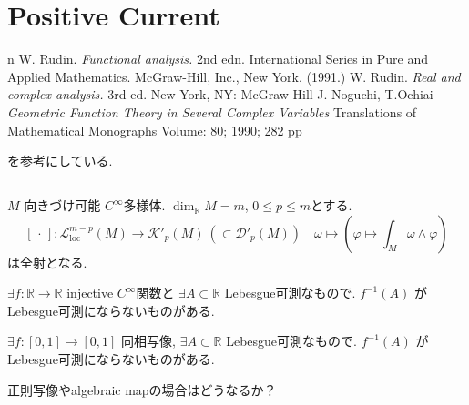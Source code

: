 \chapter{Positive Current}

\begin{thebibliography}{n}
W. Rudin. \textit{Functional analysis.} 2nd edn. International Series in Pure and Applied Mathematics. McGraw-Hill, Inc., New York. (1991.)
W. Rudin. \textit{Real and complex analysis. } 3rd ed. New York, NY: McGraw-Hill 
J. Noguchi, T.Ochiai \textit{Geometric Function Theory in Several Complex Variables} Translations of Mathematical Monographs
Volume: 80; 1990; 282 pp
\end{thebibliography}
 
\cite[Chapter 3]{NO}を参考にしている. 

\section{}

\begin{tcolorbox}[mybox]
\begin{prop}
 \(M\) 向きづけ可能 \(C^\infty\)多様体. 
  \(\dim_{\mathbb R} M = m\),  \(0 \le p \le m\)とする. 
\[
[\,\cdot\,] : \mathcal{L}^{m-p}_{\mathrm{loc}}(M) \to \mathcal{K}'_p(M)\ (\subset \mathcal{D}'_p(M))
\quad
\omega \longmapsto \left(\varphi \mapsto \int_M \omega \wedge \varphi\right)
\]
は全射となる. 
\end{prop}
\end{tcolorbox}

\begin{rem}
 \(\exists f:\mathbb{R}\to\mathbb{R}\) injective \(C^\infty\)関数と \(\exists A \subset \mathbb{R}\) Lebesgue可測なもので. 
\(f^{-1}(A)\) がLebesgue可測にならないものがある.

\(\exists f:[0,1]\to[0,1]\) 同相写像, \(\exists A \subset \mathbb{R}\) Lebesgue可測なもので. 
\(f^{-1}(A)\) がLebesgue可測にならないものがある.
\end{rem}
\begin{ques}
正則写像やalgebraic mapの場合はどうなるか？
\end{ques}


